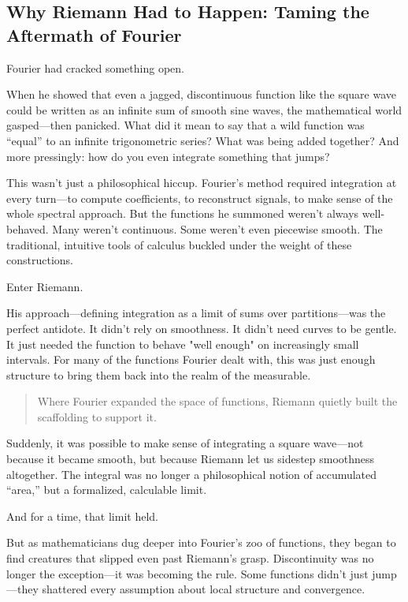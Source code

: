 \subsection{Why Riemann Had to Happen: Taming the Aftermath of Fourier}

Fourier had cracked something open.

When he showed that even a jagged, discontinuous function like the square wave could be written as an infinite sum of smooth sine waves, the mathematical world gasped—then panicked. What did it mean to say that a wild function was “equal” to an infinite trigonometric series? What was being added together? And more pressingly: how do you even integrate something that jumps?

This wasn’t just a philosophical hiccup. Fourier’s method required integration at every turn—to compute coefficients, to reconstruct signals, to make sense of the whole spectral approach. But the functions he summoned weren’t always well-behaved. Many weren’t continuous. Some weren’t even piecewise smooth. The traditional, intuitive tools of calculus buckled under the weight of these constructions.

Enter Riemann.

His approach—defining integration as a limit of sums over partitions—was the perfect antidote. It didn’t rely on smoothness. It didn’t need curves to be gentle. It just needed the function to behave "well enough" on increasingly small intervals. For many of the functions Fourier dealt with, this was just enough structure to bring them back into the realm of the measurable.

\begin{quote}
Where Fourier expanded the space of functions,  
Riemann quietly built the scaffolding to support it.
\end{quote}

Suddenly, it was possible to make sense of integrating a square wave—not because it became smooth, but because Riemann let us sidestep smoothness altogether. The integral was no longer a philosophical notion of accumulated “area,” but a formalized, calculable limit.

And for a time, that limit held.

But as mathematicians dug deeper into Fourier’s zoo of functions, they began to find creatures that slipped even past Riemann’s grasp. Discontinuity was no longer the exception—it was becoming the rule. Some functions didn’t just jump—they shattered every assumption about local structure and convergence.

